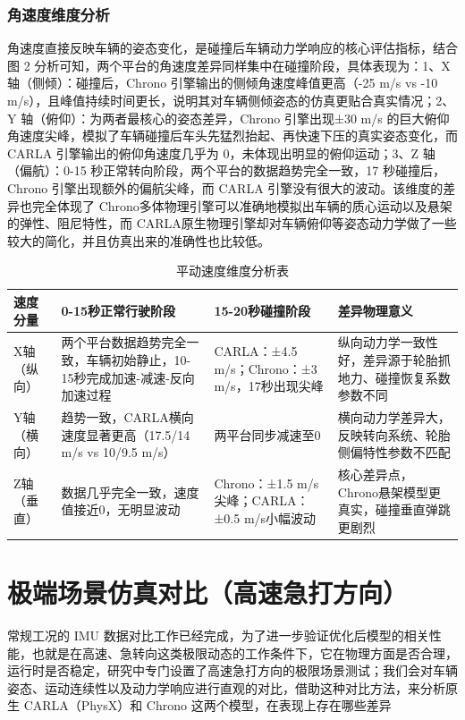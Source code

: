 \subsubsection{角速度维度分析}
角速度直接反映车辆的姿态变化，是碰撞后车辆动力学响应的核心评估指标，结合图 2 分析可知，两个平台的角速度差异同样集中在碰撞阶段，具体表现为：1、X 轴（侧倾）：碰撞后，Chrono 引擎输出的侧倾角速度峰值更高（-25 m/s vs -10 m/s），且峰值持续时间更长，说明其对车辆侧倾姿态的仿真更贴合真实情况；2、Y 轴（俯仰）：为两者最核心的姿态差异，Chrono 引擎出现±30 m/s 的巨大俯仰角速度尖峰，模拟了车辆碰撞后车头先猛烈抬起、再快速下压的真实姿态变化，而 CARLA 引擎输出的俯仰角速度几乎为 0，未体现出明显的俯仰运动；3、Z 轴（偏航）：0-15 秒正常转向阶段，两个平台的数据趋势完全一致，17 秒碰撞后，Chrono 引擎出现额外的偏航尖峰，而 CARLA 引擎没有很大的波动。该维度的差异也完全体现了 Chrono多体物理引擎可以准确地模拟出车辆的质心运动以及悬架的弹性、阻尼特性，而 CARLA原生物理引擎却对车辆俯仰等姿态动力学做了一些较大的简化，并且仿真出来的准确性也比较低。
\begin{table}[H]
	\centering
	\caption{平动速度维度分析表}
	\label{平动速度维度分析表}
	\begin{tabularx}{\linewidth}{lXXX}
		\toprule
		速度分量    & 0-15秒正常行驶阶段             & 15-20秒碰撞阶段   &差异物理意义 \\
		\midrule
		X轴（纵向）  & 两个平台数据趋势完全一致，车辆初始静止，10-15秒完成加速-减速-反向加速过程 & CARLA：±4.5 m/s；Chrono：±3 m/s，17秒出现尖峰 & 纵向动力学一致性好，差异源于轮胎抓地力、碰撞恢复系数参数不同\\
		\midrule
		Y轴（横向）  & 趋势一致，CARLA横向速度显著更高（17.5/14 m/s vs 10/9.5 m/s）& 两平台同步减速至0 & 横向动力学差异大，反映转向系统、轮胎侧偏特性参数不匹配\\
		\midrule
		Z轴（垂直）  & 数据几乎完全一致，速度值接近0，无明显波动 & Chrono：±1.5 m/s尖峰；CARLA：±0.5 m/s小幅波动 & 核心差异点，Chrono悬架模型更真实，碰撞垂直弹跳更剧烈 \\
		\bottomrule
	\end{tabularx}
\end{table}

\section{极端场景仿真对比（高速急打方向）}

常规工况的 IMU 数据对比工作已经完成，为了进一步验证优化后模型的相关性能，也就是在高速、急转向这类极限动态的工作条件下，它在物理方面是否合理，运行时是否稳定，研究中专门设置了高速急打方向的极限场景测试；我们会对车辆姿态、运动连续性以及动力学响应进行直观的对比，借助这种对比方法，来分析原生 CARLA（PhysX）和 Chrono 这两个模型，在表现上存在哪些差异
